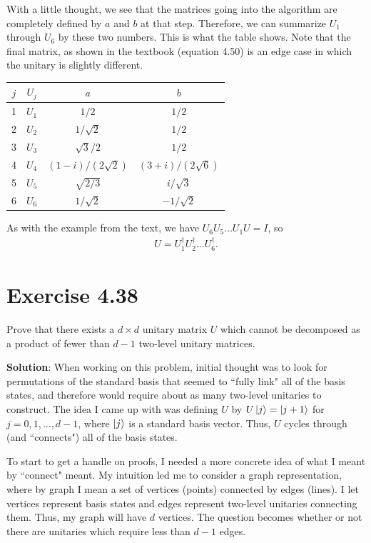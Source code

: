 \documentclass{book}
\begin{document}
    With a little thought, we see that the matrices going into the algorithm are completely defined by $a$ and $b$ at that step. Therefore, we can summarize $U_1$ through $U_6$ by these two numbers. This is what the table shows. Note that the final matrix, as shown in the textbook (equation 4.50) is an edge case in which the unitary is slightly different.

    \begin{center}
        \begin{tabular}{ c c c c }
         $j$ & $U_j$ & $a$ & $b$ \\ 
         \hline
         1   & $U_1$ & $1/2$               & $1/2$ \\  
         2   & $U_2$ & $1/\sqrt{2}$        & $1/2$ \\
         3   & $U_3$ & $\sqrt{3}/2$        & $1/2$ \\
         4   & $U_4$ & $(1-i)/(2\sqrt{2})$ & $(3+i)/(2\sqrt{6})$ \\
         5   & $U_5$ & $\sqrt{2/3}$          & $i/\sqrt{3}$ \\
         6   & $U_6$ & $1/\sqrt{2}$          & $-1/\sqrt{2}$
        \end{tabular}
    \end{center}

    As with the example from the text, we have $U_6 U_5 \dots U_1 U = I$, so 
    \begin{align}
        U = U_1^\dagger U_2^\dagger \dots U_6^\dagger.
    \end{align}

\section*{Exercise 4.38}
    Prove that there exists a $d\times d$ unitary matrix $U$ which cannot be decomposed as a product of fewer than $d-1$ two-level unitary matrices.

    \textbf{Solution}: When working on this problem, initial thought was to look for permutations of the standard basis that seemed to ``fully link" all of the basis states, and therefore would require about as many two-level unitaries to construct. The idea I came up with was defining $U$ by $U\ket{j} = \ket{j+1}$ for $j = 0,1,\dots, d-1$, where $\ket{j}$ is a standard basis vector. Thus, $U$ cycles through (and ``connects") all of the basis states.

    To start to get a handle on proofs, I needed a more concrete idea of what I meant by ``connect" meant. My intuition led me to consider a graph representation, where by graph I mean a set of vertices (points) connected by edges (lines). I let vertices represent basis states and edges represent two-level unitaries connecting them. Thus, my graph will have $d$ vertices. The question becomes whether or not there are unitaries which require less than $d-1$ edges. 
\end{document}
